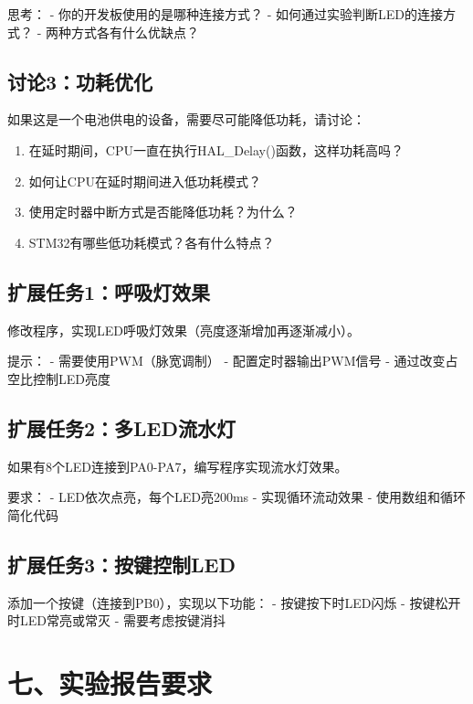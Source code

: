 \documentclass[
  chinese,
  UTF8,
  oneside,
  openany]{ctexbook}
\providecommand{\tightlist}{%
  \setlength{\itemsep}{0pt}\setlength{\parskip}{0pt}}
\begin{document}
思考： - 你的开发板使用的是哪种连接方式？ -
如何通过实验判断LED的连接方式？ - 两种方式各有什么优缺点？

\subsection{讨论3：功耗优化}\label{ux8ba8ux8bba3ux529fux8017ux4f18ux5316}

如果这是一个电池供电的设备，需要尽可能降低功耗，请讨论：

\begin{enumerate}
\def\labelenumi{\arabic{enumi}.}
\tightlist
\item
  在延时期间，CPU一直在执行HAL\_Delay()函数，这样功耗高吗？
\item
  如何让CPU在延时期间进入低功耗模式？
\item
  使用定时器中断方式是否能降低功耗？为什么？
\item
  STM32有哪些低功耗模式？各有什么特点？
\end{enumerate}

\subsection{扩展任务1：呼吸灯效果}\label{ux6269ux5c55ux4efbux52a11ux547cux5438ux706fux6548ux679c}

修改程序，实现LED呼吸灯效果（亮度逐渐增加再逐渐减小）。

提示： - 需要使用PWM（脉宽调制） - 配置定时器输出PWM信号 -
通过改变占空比控制LED亮度

\subsection{扩展任务2：多LED流水灯}\label{ux6269ux5c55ux4efbux52a12ux591aledux6d41ux6c34ux706f}

如果有8个LED连接到PA0-PA7，编写程序实现流水灯效果。

要求： - LED依次点亮，每个LED亮200ms - 实现循环流动效果 -
使用数组和循环简化代码

\subsection{扩展任务3：按键控制LED}\label{ux6269ux5c55ux4efbux52a13ux6309ux952eux63a7ux5236led}

添加一个按键（连接到PB0），实现以下功能： - 按键按下时LED闪烁 -
按键松开时LED常亮或常灭 - 需要考虑按键消抖

\section{七、实验报告要求}\label{ux4e03ux5b9eux9a8cux62a5ux544aux8981ux6c42}
\end{document}
